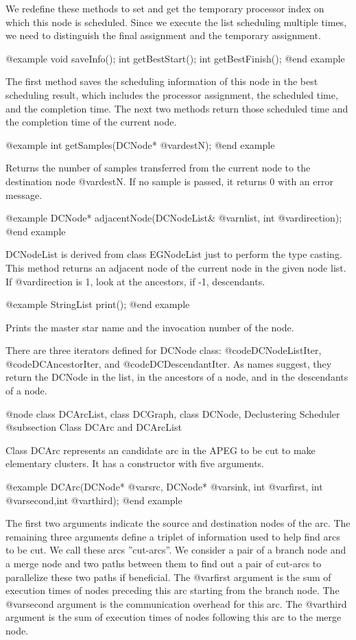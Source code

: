 We redefine these methods to set and get the temporary processor index on
which this node is scheduled. Since we execute the list scheduling
multiple times, we need to distinguish the final assignment and the
temporary assignment.

@example
void saveInfo();
int getBestStart();
int getBestFinish();
@end example

The first method saves the scheduling information of this node in
the best scheduling result, which includes the processor assignment, the
scheduled time, and the completion time. The next two methods return
those scheduled time and the completion time of the current node.

@example
int getSamples(DCNode* @var{destN});
@end example

Returns the number of samples transferred from the current node to the
destination node @var{destN}. If no sample is passed, it returns 0 with
an error message.

@example 
DCNode* adjacentNode(DCNodeList& @var{nlist}, int @var{direction});
@end example

DCNodeList is derived from class EGNodeList just to perform the type
casting. This method returns an adjacent node of the current node
in the given node list. If @var{direction} is 1, look at the ancestors,
if -1, descendants.

@example
StringList print();
@end example

Prints the master star name and the invocation number of the node.

There are three iterators defined for DCNode class: @code{DCNodeListIter},
@code{DCAncestorIter}, and @code{DCDescendantIter}. As names suggest,
they return the DCNode in the list, in the ancestors of a node, and in
the descendants of a node.

@node class DCArcList, class DCGraph, class DCNode, Declustering Scheduler
@subsection Class DCArc and DCArcList

Class DCArc represents an candidate arc in the APEG to be cut to make
elementary clusters. It has a constructor with five arguments.

@example
DCArc(DCNode* @var{src}, DCNode* @var{sink}, int @var{first}, int @var{second},int @var{third});
@end example

The first two arguments indicate the source and destination nodes of the arc.
The remaining three arguments define a triplet of information used to help
find arcs to be cut. We call these arcs ''cut-arcs''. 
We consider a pair
of a branch node and a merge node and two paths between them to find out
a pair of cut-arcs to parallelize these two paths if beneficial.
The @var{first} argument is the sum of execution times of
nodes preceding this arc starting from the branch node.
The @var{second} argument is the communication overhead for this arc.
The @var{third} argument is the sum of execution times of nodes following this
arc to the merge node.

